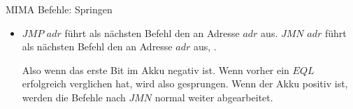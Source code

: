 \documentclass[handout]{beamer}
\begin{document}
\begin{frame}{MIMA Befehle: Springen}
	\begin{itemize}
		\pitem Normalerweise wird die Instruktionsadresse nach jedem Befehl um eins erhöht
		\pitem Also Befehle werden von oben nach unten abgearbeitet
		\pitem Mit Sprüngen kann man die MIMA zwingen, zu definierten Befehlen zu springen und damit die Vorgehensreihenfolge zu beeinflussen
		
		\vspace{.3cm} \bp
		
		\item $JMP$ $adr$ führt als nächsten Befehl den an Adresse $adr$ aus.
		\pitem $JMN$ $adr$ führt als nächsten Befehl den an Adresse $adr$ aus, .
		\begin{itemize}
			\pitem Also wenn das erste Bit im Akku negativ ist.
			\pitem Wenn vorher ein $EQL$ erfolgreich verglichen hat, wird also gesprungen.
			\pitem Wenn der Akku positiv ist, werden die Befehle nach $JMN$ normal weiter abgearbeitet.
		\end{itemize}
	\end{itemize}
\end{frame}
	
\end{document}
